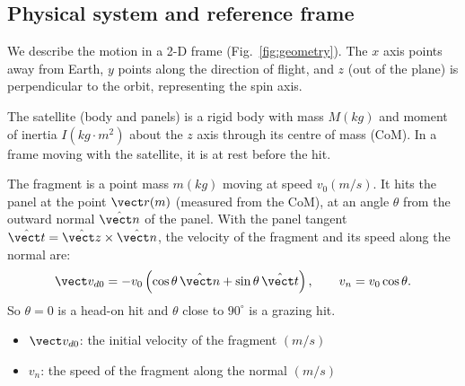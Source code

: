 \subsection{Physical system and reference frame}

We describe the motion in a 2-D frame (Fig.~\ref{fig:geometry}).
The $x$ axis points away from Earth, $y$ points along the direction of
flight, and $z$ (out of the plane) is perpendicular to the orbit, representing the spin axis.

The satellite (body and panels) is a rigid body with mass $M (kg)$ and moment
of inertia $I (kg\cdot m^2)$ about the $z$ axis through its centre of mass (CoM). In a frame
moving with the satellite, it is at rest before the hit.

The fragment is a point mass $m (kg)$ moving at speed $v_0 (m/s)$. It hits
the panel at the point $\vect r (m)$ (measured from the CoM), at an angle
$\theta$ from the outward normal $\hat{\vect n}$ of the panel. With the
panel tangent $\hat{\vect t}=\hat{\vect z}\times\hat{\vect n}$, the
velocity of the fragment and its speed along the normal are:
\begin{equation}
  \vect v_{d0}=-v_0\left(\cos\theta\,\hat{\vect n}+\sin\theta\,\hat{\vect t}\right),
  \qquad v_n=v_0\cos\theta .
  \label{eq:vd0}
\end{equation}
So $\theta=0$ is a head-on hit and $\theta$ close to $90^\circ$ is a
grazing hit.

\begin{itemize}
  \item $\vect v_{d0}$: the initial velocity  of the fragment $(m/s)$
  \item $v_n$: the speed of the fragment along the normal $(m/s)$
\end{itemize}

